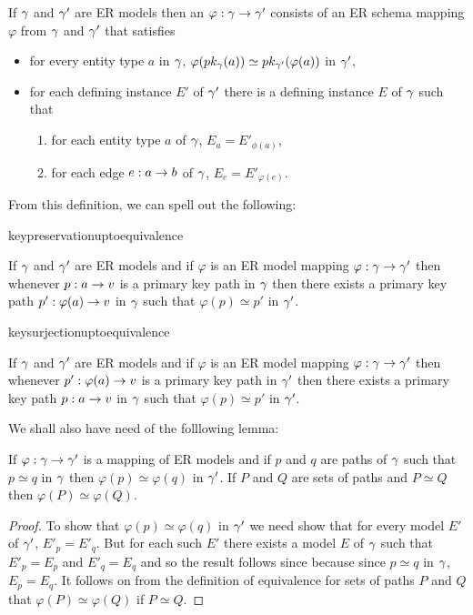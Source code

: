 \begin{definition}
If $\gmodel$ and  $\gmodel'$ are ER models then an 
$\varphi : \gmodel \morph \gmodel'$ consists of an ER schema mapping $\varphi$ from $\gmodel$ and  $\gmodel'$ that satisfies
\begin{itemize}
\item for every entity type $a$ in $\gmodel$, $\varphi(\pk{a}) \simeq \pk[\gmodel']{\varphi(a)}$
in $\gmodel'$,
\item  for each defining instance $E'$  of $\gmodel'$ there is a defining instance $E$ of $\gmodel$ such that
\begin{enumerate}
\item for each entity type $a$ of $\gmodel$, $E_a = E'_{\phi(a)}$,
\item for each edge $e:a \morph b$ of $\gmodel$, $E_e = E'_{\varphi(e)}$.
\end{enumerate} 
\end{itemize}
\end{definition}

From this definition, we can spell out the following:

keypreservationuptoequivalence
\begin{observation}
If $\gmodel$ and $\gmodel'$ are ER models and if $\varphi$ is an ER model mapping $\varphi: \gmodel \morph \gmodel'$ then whenever 
$p:a \morph \veee$ is a primary key path in $\gmodel$ then there exists a primary key path 
$p':\varphi(a) \morph \veee$ in $\gmodel$ such that $\varphi(p) \simeq p'$ in $\gmodel'$.
\end{observation}

keysurjectionuptoequivalence
\begin{observation}
If $\gmodel$ and $\gmodel'$ are ER models and if $\varphi$ is an ER model mapping $\varphi: \gmodel \morph \gmodel'$ then whenever $p':\varphi(a) \morph \veee$ is a primary key path in $\gmodel'$ then there exists a primary key path $p:a \morph \veee$ in $\gmodel$ such that $\varphi(p) \simeq p'$ in $\gmodel'$.
\end{observation}

We shall also have need of the folllowing lemma:
\begin{lemma}
If $\varphi: \gmodel \morph \gmodel'$ is a mapping of ER models and
if $p$ and $q$ are paths of $\gmodel$ such that $p \simeq q$ in $\gmodel$ then $\varphi(p) \simeq \varphi(q)$ in $\gmodel'$. If $P$ and $Q$ are sets of paths and $P \simeq Q$ then $\varphi(P) \simeq \varphi(Q)$.
\end{lemma}
\begin{proof}
To show that $\varphi(p) \simeq \varphi(q)$ in $\gmodel'$ we need show that for every model $E'$ of $\gmodel'$, $E'_p=E'_q$. But for each such $E'$ there exists a model $E$ of $\gmodel$ such that $E'_p=E_p$ and $E'_q=E_q$ and so the result follows since because since $p\simeq q$ in $\gmodel$, $E_p=E_q$.
It follows on from the definition of equivalence for sets of paths $P$ and $Q$ that $\varphi(P) \simeq \varphi(Q)$ if $P \simeq Q$.
\end{proof}

